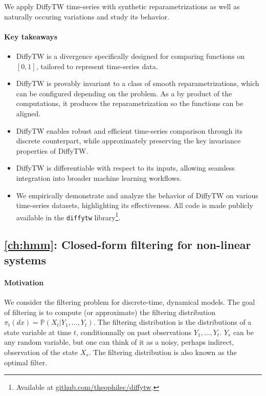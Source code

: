 We apply DiffyTW time-series with synthetic reparametrizations as well as naturally occuring variations and study its behavior.

\paragraph{Key takeaways}
\begin{itemize}
    \item DiffyTW is a divergence specifically designed for comparing functions on $[0,1]$, tailored to represent time-series data.
    \item DiffyTW is provably invariant to a class of smooth reparametrizations, which can be configured depending on the problem. As a by product of the computations, it produces the reparametrization so the functions can be aligned.
    \item DiffyTW enables robust and efficient time-series comparison through its discrete counterpart, while approximately preserving the key invariance properties of DiffyTW.
    \item DiffyTW is differentiable with respect to its inputs, allowing seamless integration into broader machine learning workflows.
    \item We empirically demonstrate and analyze the behavior of DiffyTW on various time-series datasets, highlighting its effectiveness. All code is made publicly available in the \texttt{diffytw} library\footnote{Available at \url{github.com/theophilec/diffytw}.}.
\end{itemize}

\subsection*{\cref{ch:hmm}: Closed-form filtering for non-linear systems}

\paragraph{Motivation}
We consider the filtering problem for discrete-time, dynamical models. The goal of filtering is to compute (or approximate) the filtering distribution $\pi_t(dx) = \mathbb P(X_t\vert Y_1, \ldots, Y_{t})$. The filtering distribution is the distributions of a state variable at time $t$, conditionnally on past observations $Y_1, \ldots, Y_t$. $Y_s$ can be any random variable, but one can think of it as a noisy, perhaps indirect, observation of the state $X_s$. The filtering distribution is also known as the optimal filter.

